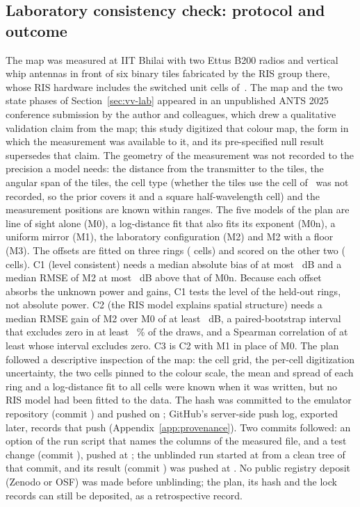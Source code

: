 \subsection{Laboratory consistency check: protocol and outcome}
The map was measured at IIT Bhilai with two Ettus B200 radios and vertical whip
antennas in front of six binary tiles fabricated by the RIS group there, whose RIS hardware includes
the switched unit cells of~\cite{Khan2025INDICON}. The map and the two state phases of
Section~\ref{sec:vv-lab} appeared in an unpublished ANTS 2025 conference
submission by the author and colleagues, which drew a qualitative validation claim from the map; this study digitized that
colour map, the form in which the measurement was available to it, and its pre-specified null
result supersedes that claim. The geometry of the measurement was not recorded to the
precision a model needs: the distance from the transmitter to the tiles, the angular span of
the tiles, the cell type (whether the tiles use the cell of~\cite{Khan2025INDICON} was not
recorded, so the prior covers it and a square half-wavelength cell) and the measurement
positions are known within ranges.
The five models of the plan are line of sight alone (M0),
a log-distance fit that also fits its exponent (M0n), a uniform mirror (M1), the laboratory configuration (M2) and M2 with
a floor (M3). The offsets are fitted on three rings (\numLabTrainCells{} cells) and scored on
the other two (\numLabTestCells{} cells). C1
(level consistent) needs a median absolute bias of at most \numLabConeBiasMaxDb~dB and a
median RMSE of M2 at most \numLabConeMarginDb~dB above that of M0n. Because each offset absorbs the unknown power and
gains, C1 tests the level of the held-out rings, not absolute power. C2 (the RIS model
explains spatial structure) needs a median RMSE gain of M2 over M0 of at least
\numLabCtwoMinDb~dB, a paired-bootstrap interval that excludes zero in at least
\numLabCtwoCiFracPct~\% of the draws, and a Spearman correlation of at least
\numLabCtwoRhoMin{} whose interval excludes zero. C3 is C2 with M1 in place of M0.
The plan followed a descriptive inspection of the map: the cell grid, the per-cell
digitization uncertainty, the two cells pinned to the colour scale, the mean and spread of
each ring and a log-distance fit to all cells were known when it was written, but no RIS model
had been fitted to the data. The hash was committed to the emulator repository (commit \txtLabLockCommit) and pushed on
\txtLabLockDate; GitHub's server-side push log,
exported later, records that push (Appendix~\ref{app:provenance}). Two commits followed: an
option of the run script that names the columns of the measured file, and a test change
(commit \txtLabCodeCommit), pushed at \txtLabCodePushTime; the unblinded run started at
\txtLabRunTime{} from a clean tree of that commit, and its result
(commit \txtLabResultCommit) was pushed at \txtLabResultPushTime. No public registry deposit
(Zenodo or OSF) was made before unblinding; the plan, its hash and the lock records can still
be deposited, as a retrospective record.

